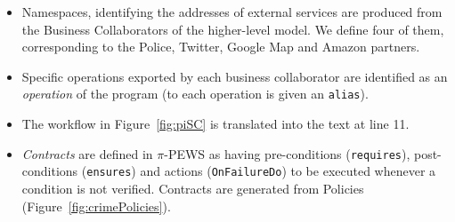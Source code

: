 \begin{itemize}
\item
Namespaces, identifying the addresses of external services are produced from the Business Collaborators of the higher-level model. 
We define four of them, corresponding to the Police, Twitter, Google Map and Amazon partners.
\item
Specific operations exported by each business collaborator are identified as an \textit{operation} of the program (to each operation is given an \texttt{alias}).
\item
The workflow in Figure~\ref{fig:piSC} is translated into the text at line 11.
\item
\textit{Contracts} are defined in $\pi$-PEWS as having pre-conditions (\texttt{requires}), post-conditions (\texttt{ensures}) and actions (\texttt{OnFailureDo}) to be executed whenever a condition is not verified. 
Contracts are generated from Policies (Figure~\ref{fig:crimePolicies}).
\end{itemize}



